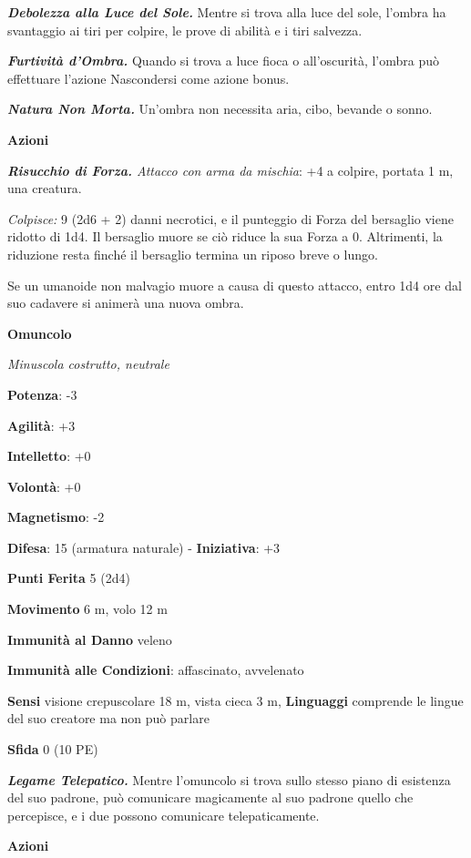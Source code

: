 \begin{multicols}{2}
\emph{\textbf{Debolezza alla Luce del Sole.}} Mentre si trova alla luce
del sole, l'ombra ha svantaggio ai tiri per colpire, le prove di abilità
e i tiri salvezza.

\emph{\textbf{Furtività d'Ombra.}} Quando si trova a luce fioca o
all'oscurità, l'ombra può effettuare l'azione Nascondersi come azione
bonus.

\emph{\textbf{Natura Non Morta.}} Un'ombra non necessita aria, cibo,
bevande o sonno.

\smallskip\textbf{Azioni}

\emph{\textbf{Risucchio di Forza.} Attacco con arma da mischia}: +4 a
colpire, portata 1 m, una creatura.

\emph{Colpisce:} 9 (2d6 + 2) danni necrotici, e il punteggio di Forza
del bersaglio viene ridotto di 1d4. Il bersaglio muore se ciò riduce la
sua Forza a 0. Altrimenti, la riduzione resta finché il bersaglio
termina un riposo breve o lungo.

Se un umanoide non malvagio muore a causa di questo attacco, entro 1d4
ore dal suo cadavere si animerà una nuova ombra.

\textbf{Omuncolo}

\emph{Minuscola costrutto, neutrale}

\textbf{Potenza}: -3

\textbf{Agilità}: +3

\textbf{Intelletto}: +0

\textbf{Volontà}: +0

\textbf{Magnetismo}: -2

\textbf{Difesa}: 15 (armatura naturale) - \textbf{Iniziativa}: +3

\textbf{Punti Ferita} 5 (2d4)

\textbf{Movimento} 6 m, volo 12 m

\textbf{Immunità al Danno} veleno

\textbf{Immunità alle Condizioni}: affascinato, avvelenato

\textbf{Sensi} visione crepuscolare 18 m, vista cieca 3 m, 
\textbf{Linguaggi} comprende le lingue del suo creatore ma non può
parlare

\textbf{Sfida} 0 (10 PE)\smallskip

\emph{\textbf{Legame Telepatico.}} Mentre l'omuncolo si trova sullo
stesso piano di esistenza del suo padrone, può comunicare magicamente al
suo padrone quello che percepisce, e i due possono comunicare
telepaticamente.

\smallskip\textbf{Azioni}


\end{multicols}
